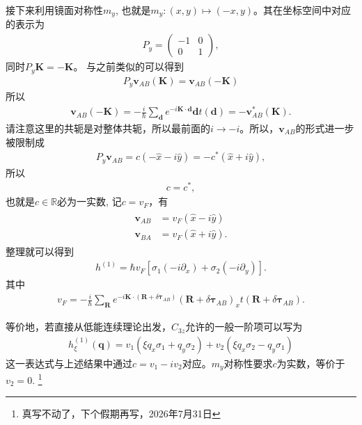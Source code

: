 \documentclass[10pt, oneside]{article}
\begin{document}
接下来利用镜面对称性\(m_y\), 也就是\(m_{y} : \left(x,y\right) \mapsto \left(-x, y\right)\)。其在坐标空间中对应的表示为
\begin{align}
	P_y = \begin{pmatrix}
		-1 & 0 \\ 0 & 1
	\end{pmatrix},
\end{align}
同时\(P_y \bm{K} = - \bm{K }\)。 与之前类似的可以得到
\begin{align}
	P_y \bm{v }_{AB} \left(\bm{K}\right) = \bm{v }_{AB} \left( - \bm{K}\right)
\end{align}
所以
\begin{align}
	\bm{v }_{AB} \left( - \bm{K}\right) = - \frac{i}{\hbar} \sum_{\bm{d }} e^{-i \bm{K }\cdot \bm{d}} \bm{d } t \left(\bm{d }\right) = - \bm{v }_{AB}^{*} \left(\bm{K}\right).
\end{align}
请注意这里的共轭是对整体共轭，所以最前面的\(i \rightarrow -i\)。所以，\(\bm{v }_{AB}\)的形式进一步被限制成
\begin{align}
	P_y \bm{v }_{AB} = c \left(- \hat{x } -i \hat{y}\right) = - c^{*} \left(\hat{x } + i \hat{y}\right),
\end{align}
所以
\begin{align}
	c = c^{*},
\end{align}
也就是\(c \in \mathbb{R }\)必为一实数, 记\(c = v_{F}\)，有
\begin{align}
	\begin{split}
		\bm{v }_{AB} & =v_{F} \left(\hat{x} - i \hat{y}\right) \\
		\bm{v }_{BA} & = v_{F} \left(\hat{x} + i \hat{y}\right).
	\end{split}
\end{align}
整理就可以得到
\begin{align}
	\boxed{
		h^{\left(1\right)}  = \hbar v_{F} \left[\sigma_{1} \left(-i \partial_{x }\right) + \sigma_{2} \left(-i \partial_{y}\right)\right].
	}
\end{align}
其中
\begin{align}
	\boxed{
		v_{F} = -  \frac{i }{\hbar} \sum_{\bm{R }} e^{-i \bm{K } \cdot \left(\bm{R } + \delta \bm{\tau}_{AB}\right)}  \left(\bm{R } + \delta \bm{\tau}_{AB}\right)_{x } t  \left(\bm{R } + \delta \bm{\tau}_{AB}\right).
	}
\end{align} 
\vspace{2em}

等价地，若直接从低能连续理论出发，\(C_{3z}\)允许的一般一阶项可以写为
\begin{align}
	h^{\left(1\right)}_{\xi} \left(\bm{q }\right) = v_1 \left(\xi q_x \sigma_{1} + q_y \sigma_{2}\right) + v_2 \left(\xi q_x \sigma_{2} - q_y \sigma_{1}\right)
\end{align}
这一表达式与上述结果中通过\(c = v_1 -i v_2\)对应。\(m_y\)对称性要求\(c \)为实数，等价于\(v_{2} = 0\). \footnote{真写不动了，下个假期再写，2026年7月31日}
\end{document}
